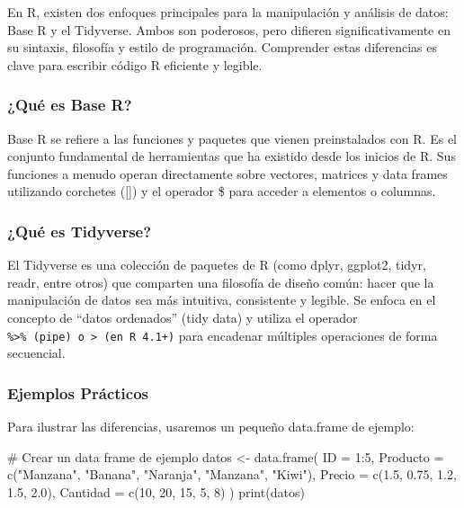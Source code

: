 \documentclass[
  letterpaper,
  DIV=11,
  numbers=noendperiod]{scrartcl}
\newenvironment{Shaded}{\begin{snugshade}}{\end{snugshade}}
\newcommand{\AttributeTok}[1]{\textcolor[rgb]{0.40,0.45,0.13}{#1}}
\newcommand{\CommentTok}[1]{\textcolor[rgb]{0.37,0.37,0.37}{#1}}
\newcommand{\DecValTok}[1]{\textcolor[rgb]{0.68,0.00,0.00}{#1}}
\newcommand{\FloatTok}[1]{\textcolor[rgb]{0.68,0.00,0.00}{#1}}
\newcommand{\FunctionTok}[1]{\textcolor[rgb]{0.28,0.35,0.67}{#1}}
\newcommand{\NormalTok}[1]{\textcolor[rgb]{0.00,0.23,0.31}{#1}}
\newcommand{\OtherTok}[1]{\textcolor[rgb]{0.00,0.23,0.31}{#1}}
\newcommand{\SpecialCharTok}[1]{\textcolor[rgb]{0.37,0.37,0.37}{#1}}
\newcommand{\StringTok}[1]{\textcolor[rgb]{0.13,0.47,0.30}{#1}}
\begin{document}
En R, existen dos enfoques principales para la manipulación y análisis
de datos: Base R y el Tidyverse. Ambos son poderosos, pero difieren
significativamente en su sintaxis, filosofía y estilo de programación.
Comprender estas diferencias es clave para escribir código R eficiente y
legible.

\subsubsection{¿Qué es Base R?}\label{quuxe9-es-base-r}

Base R se refiere a las funciones y paquetes que vienen preinstalados
con R. Es el conjunto fundamental de herramientas que ha existido desde
los inicios de R. Sus funciones a menudo operan directamente sobre
vectores, matrices y data frames utilizando corchetes ({[}{]}) y el
operador \$ para acceder a elementos o columnas.

\subsubsection{¿Qué es Tidyverse?}\label{quuxe9-es-tidyverse}

El Tidyverse es una colección de paquetes de R (como dplyr, ggplot2,
tidyr, readr, entre otros) que comparten una filosofía de diseño común:
hacer que la manipulación de datos sea más intuitiva, consistente y
legible. Se enfoca en el concepto de ``datos ordenados'' (tidy data) y
utiliza el operador
\texttt{\%\textgreater{}\%\ (pipe)\ o\ \textbar{}\textgreater{}\ (en\ R\ 4.1+)}
para encadenar múltiples operaciones de forma secuencial.

\subsubsection{Ejemplos Prácticos}\label{ejemplos-pruxe1cticos}

Para ilustrar las diferencias, usaremos un pequeño data.frame de
ejemplo:

\begin{Shaded}
\begin{Highlighting}[]
\CommentTok{\# Crear un data frame de ejemplo}
\NormalTok{datos }\OtherTok{\textless{}{-}} \FunctionTok{data.frame}\NormalTok{(}
  \AttributeTok{ID =} \DecValTok{1}\SpecialCharTok{:}\DecValTok{5}\NormalTok{,}
  \AttributeTok{Producto =} \FunctionTok{c}\NormalTok{(}\StringTok{"Manzana"}\NormalTok{, }\StringTok{"Banana"}\NormalTok{, }\StringTok{"Naranja"}\NormalTok{, }\StringTok{"Manzana"}\NormalTok{, }\StringTok{"Kiwi"}\NormalTok{),}
  \AttributeTok{Precio =} \FunctionTok{c}\NormalTok{(}\FloatTok{1.5}\NormalTok{, }\FloatTok{0.75}\NormalTok{, }\FloatTok{1.2}\NormalTok{, }\FloatTok{1.5}\NormalTok{, }\FloatTok{2.0}\NormalTok{),}
  \AttributeTok{Cantidad =} \FunctionTok{c}\NormalTok{(}\DecValTok{10}\NormalTok{, }\DecValTok{20}\NormalTok{, }\DecValTok{15}\NormalTok{, }\DecValTok{5}\NormalTok{, }\DecValTok{8}\NormalTok{)}
\NormalTok{)}
\FunctionTok{print}\NormalTok{(datos)}
\end{Highlighting}
\end{Shaded}
\end{document}
